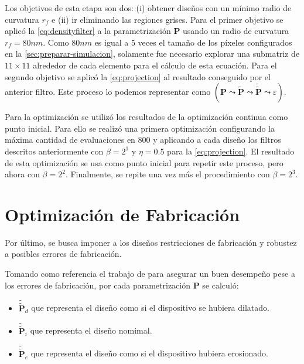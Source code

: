 Los objetivos de esta etapa son dos: (i) obtener diseños con un mínimo radio de curvatura $r_f$ e
(ii) ir eliminando las regiones grises.
Para el primer objetivo se aplicó la \autoref{eq:densityfilter} a la parametrización 
$\boldsymbol{P}$ usando un radio de curvatura $r_f = 80 nm$.
Como $80nm$ es igual a 5 veces el tamaño de los píxeles configurados en la \autoref{sec:preparar-simulacion},
solamente fue necesario explorar una submatriz de $11 \times 11$ alrededor de cada elemento para el cálculo de
esta ecuación.
Para el segundo objetivo se aplicó la \autoref{eq:projection} al resultado conseguido por el anterior filtro.
Este proceso lo podemos representar como 
$(\boldsymbol{P} \mathrel{\leadsto} \widetilde{\boldsymbol{P}} \mathrel{\leadsto}
\widetilde{\widetilde{\boldsymbol{P}}} \mathrel{\leadsto} \varepsilon)$.

Para la optimización se utilizó los resultados de la optimización continua como punto inicial.
Para ello se realizó una primera optimización configurando la máxima cantidad de evaluaciones 
en 800 y aplicando a cada diseño los filtros descritos anteriormente con $\beta = 2^1$ y $\eta = 0.5$
para la \autoref{eq:projection}.
El resultado de esta optimización se usa como punto inicial para repetir este proceso, pero ahora con $\beta
= 2^2$. Finalmente, se repite una vez más el procedimiento con $\beta = 2^3$.

\section{Optimización de Fabricación}

Por último, se busca imponer a los diseños restricciones de fabricación y robustez a posibles errores
de fabricación. 

Tomando como referencia el trabajo de \cite{Hammond20} para asegurar un buen desempeño pese a los errores de
fabricación, por cada parametrización $\boldsymbol{P}$ se calculó:

\begin{itemize}
  \item $\widetilde{\widetilde{\boldsymbol{P}}}_{d}$ que representa el diseño como si el dispositivo se hubiera dilatado.
  \item $\widetilde{\widetilde{\boldsymbol{P}}}_{i}$ que representa el diseño nomimal.
  \item $\widetilde{\widetilde{\boldsymbol{P}}}_{e}$  que representa el diseño como si el dispositivo
    hubiera erosionado.
\end{itemize}

